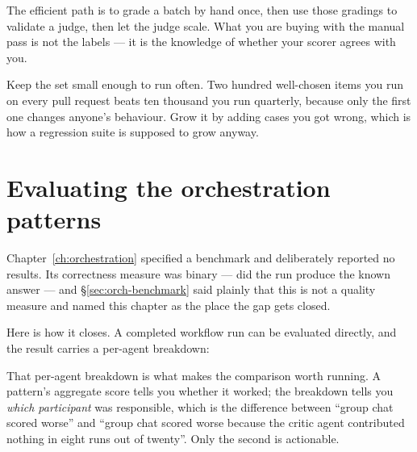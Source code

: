 The efficient path is to grade a batch by hand once, then use those gradings to
validate a judge, then let the judge scale. What you are buying with the manual
pass is not the labels --- it is the knowledge of whether your scorer agrees with
you.

\begin{note}
Keep the set small enough to run often. Two hundred well-chosen items you run on
every pull request beats ten thousand you run quarterly, because only the first
one changes anyone's behaviour. Grow it by adding cases you got wrong, which is
how a regression suite is supposed to grow anyway.
\end{note}

\section{Evaluating the orchestration patterns}
\label{sec:eval-orchestration}

Chapter~\ref{ch:orchestration} specified a benchmark and deliberately reported no
results. Its correctness measure was binary --- did the run produce the known
answer --- and \S\ref{sec:orch-benchmark} said plainly that this is not a quality
measure and named this chapter as the place the gap gets closed.

Here is how it closes. A completed workflow run can be evaluated directly, and
the result carries a per-agent breakdown:


That per-agent breakdown is what makes the comparison worth running. A pattern's
aggregate score tells you whether it worked; the breakdown tells you \emph{which
participant} was responsible, which is the difference between ``group chat scored
worse'' and ``group chat scored worse because the critic agent contributed
nothing in eight runs out of twenty''. Only the second is actionable.

